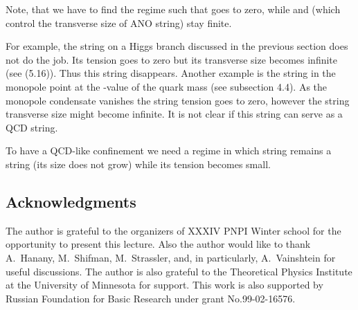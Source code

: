 \documentclass[a4paper,12pt]{article}
\begin{document}
Note, that we have to find the regime such that \coordHE{} goes to
zero, while \coordHE{} and \coordHE{} (which control the transverse
size of ANO string) stay finite.

For example, the string on a Higgs branch discussed in the
previous section does not do the job. Its tension goes to zero
but its transverse size \coordHE{} becomes infinite (see (5.16)).
Thus this string disappears. Another example is the string in the
monopole point at the \coordHE{}-value of the quark mass (see
subsection 4.4). As the monopole condensate vanishes the string
tension goes to zero, however the string transverse size
might  become
infinite. It is not clear if this string  can serve as a QCD string.

To have a QCD-like confinement we need a  regime in
which string remains a string (its size does not grow) while its
tension becomes small.


\subsection*{Acknowledgments}

The author is grateful to the organizers of XXXIV PNPI Winter school for
the opportunity to present this lecture. Also the author  would like to
thank A.~Hanany, M.~Shifman, M.~Strassler, and, in particularly,
A.~Vainshtein for useful discussions.
The author is also grateful to the Theoretical Physics Institute at the 
University of Minnesota for support.
 This work is also supported by
Russian Foundation for Basic Research under grant
No.99-02-16576.
\end{document}
